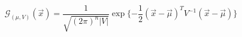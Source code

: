 \begin{equation}
    \mathcal{G}_{(\mu,V)}(\vec{x})
    =\frac{1}{\sqrt{(2\pi)^n|V|}}\exp\{-\frac{1}{2}(\vec{x}-\vec{\mu})^TV^{-1}(\vec{x}-\vec{\mu})\}
    \label{eq:multi_variable_gaussian}
\end{equation}
    